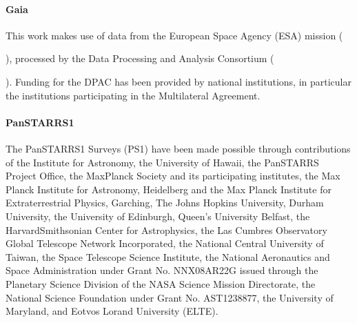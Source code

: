 \documentclass[letterpaper,11pt,english]{sphinxmanual}
\begin{document}
\paragraph{Gaia}
\label{\detokenize{user/citations:gaia}}
\sphinxAtStartPar
This work makes use of data from the European Space Agency (ESA) mission 
(%
\begin{footnote}[16]\sphinxAtStartFootnote
{}
%
\end{footnote}), processed by the  Data
Processing and Analysis Consortium
(%
\begin{footnote}[17]\sphinxAtStartFootnote
{}
%
\end{footnote}). Funding for
the DPAC has been provided by national institutions, in particular the
institutions participating in the  Multilateral Agreement.


\paragraph{Pan\sphinxhyphen{}STARRS1}
\label{\detokenize{user/citations:pan-starrs1}}
\sphinxAtStartPar
The Pan\sphinxhyphen{}STARRS1 Surveys (PS1) have been made possible through contributions of
the Institute for Astronomy, the University of Hawaii, the Pan\sphinxhyphen{}STARRS Project
Office, the Max\sphinxhyphen{}Planck Society and its participating institutes, the Max Planck
Institute for Astronomy, Heidelberg and the Max Planck Institute for
Extraterrestrial Physics, Garching, The Johns Hopkins University, Durham
University, the University of Edinburgh, Queen’s University Belfast, the
Harvard\sphinxhyphen{}Smithsonian Center for Astrophysics, the Las Cumbres Observatory
Global Telescope Network Incorporated, the National Central University of
Taiwan, the Space Telescope Science Institute, the National Aeronautics and
Space Administration under Grant No. NNX08AR22G issued through the Planetary
Science Division of the NASA Science Mission Directorate, the National
Science Foundation under Grant No. AST\sphinxhyphen{}1238877, the University of Maryland,
and Eotvos Lorand University (ELTE).
\end{document}
